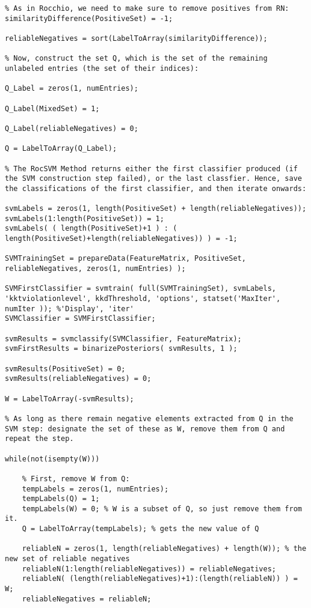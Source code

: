 \documentclass[12pt,twoside,notitlepage,amsart]{report} %
\begin{document}
\begin{lstlisting}
% As in Rocchio, we need to make sure to remove positives from RN:
similarityDifference(PositiveSet) = -1;

reliableNegatives = sort(LabelToArray(similarityDifference));

% Now, construct the set Q, which is the set of the remaining unlabeled entries (the set of their indices):

Q_Label = zeros(1, numEntries);

Q_Label(MixedSet) = 1;

Q_Label(reliableNegatives) = 0;

Q = LabelToArray(Q_Label);

% The RocSVM Method returns either the first classifier produced (if the SVM construction step failed), or the last classfier. Hence, save the classifications of the first classifier, and then iterate onwards:

svmLabels = zeros(1, length(PositiveSet) + length(reliableNegatives));
svmLabels(1:length(PositiveSet)) = 1;
svmLabels( ( length(PositiveSet)+1 ) : ( length(PositiveSet)+length(reliableNegatives)) ) = -1;
    
SVMTrainingSet = prepareData(FeatureMatrix, PositiveSet, reliableNegatives, zeros(1, numEntries) );

SVMFirstClassifier = svmtrain( full(SVMTrainingSet), svmLabels, 'kktviolationlevel', kkdThreshold, 'options', statset('MaxIter', numIter )); %'Display', 'iter' 
SVMClassifier = SVMFirstClassifier;

svmResults = svmclassify(SVMClassifier, FeatureMatrix);
svmFirstResults = binarizePosteriors( svmResults, 1 );

svmResults(PositiveSet) = 0;
svmResults(reliableNegatives) = 0;

W = LabelToArray(-svmResults);

% As long as there remain negative elements extracted from Q in the SVM step: designate the set of these as W, remove them from Q and repeat the step.
    
while(not(isempty(W)))
    
    % First, remove W from Q: 
    tempLabels = zeros(1, numEntries);
    tempLabels(Q) = 1;
    tempLabels(W) = 0; % W is a subset of Q, so just remove them from it.
    Q = LabelToArray(tempLabels); % gets the new value of Q

    reliableN = zeros(1, length(reliableNegatives) + length(W)); % the new set of reliable negatives
    reliableN(1:length(reliableNegatives)) = reliableNegatives;
    reliableN( (length(reliableNegatives)+1):(length(reliableN)) ) = W;
    reliableNegatives = reliableN;
 

\end{lstlisting}
\end{document}
